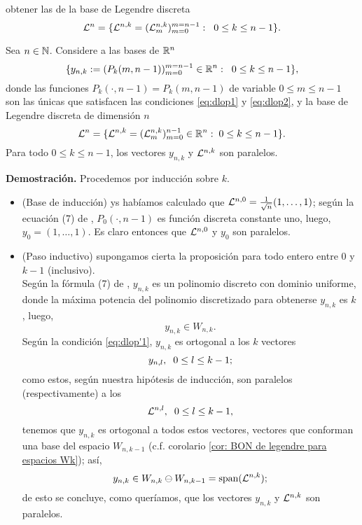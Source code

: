 \noindent
obtener las de la base de Legendre discreta
\begin{equation}
\label{eq: base Legendre}
\mathcal{L}^{n}=
\{
\mathcal{L}^{n,k}= (\mathcal{L}^{n,k}_{m})_{m=0}^{m=n-1}
: \hspace{0.2cm} 0 \leq k \leq n-1
\}.
\end{equation}


\begin{lema}
\label{prop: legendre y DLOPS son paralelos}
Sea $n \in \mathbb{N}$. 
Considere a 
las bases de $\mathbb{R}^{n}$
\begin{equation}
\label{eq0: base DLOP}
\{
y_{n,k}:= (P_{k}(m, n-1))_{m=0}^{m=n-1} \in \mathbb{R}^{n}
: \hspace{0.2cm} 0 \leq k \leq n-1
\},
\end{equation}
donde las funciones $P_{k}(\cdot , n-1)= P_{k}(m , n-1)$ de variable 
$0 \leq m \leq n-1$
son las únicas que satisfacen las condiciones
\eqref{eq:dlop1} y \eqref{eq:dlop2},
y la base de Legendre discreta de dimensión $n$
\begin{equation}
\label{eq0: base de Legendre discreta}
\mathcal{L}^{n}=\{ \mathcal{L}^{n,k}= (\mathcal{L}_{m}^{n,k})_{m=0}^{n-1} \in \mathbb{R}^{n} : 
\hspace{0.1cm} 0 \leq k \leq n-1\}.
\end{equation}
Para todo $0 \leq k \leq n-1$, los vectores 
$y_{n,k}$ y $\mathcal{L}^{n,k}$ son paralelos.
\end{lema}
\noindent
\textbf{Demostración.}
Procedemos por inducción sobre $k$.
\begin{itemize}
	\item  (Base de inducción) ys habíamos calculado que
	$\mathcal{L}^{n,0}=\frac{1}{\sqrt{n}}(1, \ldots , 1)$; 
	según la ecuación (7) de \cite{Neuman},
	 $P_{0}(\cdot , n-1)$ es función discreta constante uno, 
	luego, $y_{0}=(1, \ldots , 1)$. 
	Es	
	claro entonces que $\mathcal{L}^{n,0}$ 
	y $y_{0}$	
	son paralelos.
	
	\item (Paso inductivo) supongamos cierta la proposición para
	todo entero entre 0 y $k-1$ (inclusivo).	\\
	Según la fórmula (7) de
	\cite{Neuman}, $y_{n,k}$ es
	un polinomio discreto con dominio 
	uniforme, donde la máxima potencia
	del polinomio discretizado para obtenerse 
	$y_{n,k}$ es $k$, luego,
	\[
	y_{n,k} \in W_{n,k}.
	\]	
	Según la condición \eqref{eq:dlop'1}, $y_{n,k}$ es ortogonal a
	los $k$ vectores
	\[
	y_{n,l}, \hspace{0.2cm} 0 \leq l \leq k-1;
	\] 
	como estos, según
	nuestra hipótesis de inducción, son paralelos (respectivamente)
	a los
	\[
	\mathcal{L}^{n, l}, \hspace{0.2cm} 0 \leq l \leq k-1,
	\] 
	tenemos que $y_{n,k}$ es ortogonal a todos estos vectores,
	vectores que conforman una base del espacio $W_{n,k-1}$
	(c.f. corolario \ref{cor: BON de legendre para espacios Wk}); así,
	\[
	y_{n,k} \in W_{n,k} 
	\ominus W_{n,k-1}=\text{span}(\mathcal{L}^{n,k});
	\]
	de esto se concluye, como queríamos, que los vectores 
	$y_{n,k}$ y $\mathcal{L}^{n,k}$
	son paralelos. \QEDB 
\end{itemize}
\vspace{0.2cm}




